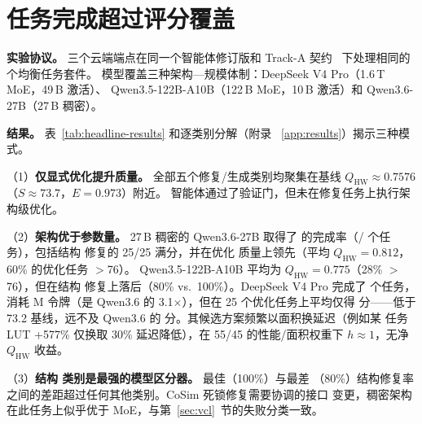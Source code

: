 \section{任务完成超过评分覆盖}
\label{sec:evaluation}

\textbf{实验协议。} 三个云端端点在同一个智能体修订版和 Track-A
契约~\cite{fpt26tracka} 下处理相同的 \CorpusTaskCount{} 个均衡任务套件。
模型覆盖三种架构—规模体制：DeepSeek V4 Pro（1.6\,T MoE，49\,B 激活）、
Qwen3.5-122B-A10B（122\,B MoE，10\,B 激活）和 Qwen3.6-27B（27\,B 稠密）。

\begin{table}[!h]
  \centering
  \caption{\textbf{最小的稠密模型领先。} 分数估计为
  $100\,Q_{\mathrm{HW}}\,E$。DeepSeek 优化任务平均分低于 73.2 基线；
  详见附录~\ref{app:results}。}
  \label{tab:headline-results}
  \scriptsize
\end{table}

\textbf{结果。} 表~\ref{tab:headline-results} 和逐类别分解（附录
~\ref{app:results}）揭示三种模式。

（1）\textbf{仅显式优化提升质量。} 全部五个修复/生成类别均聚集在基线
$Q_{\mathrm{HW}}{\approx}0.7576$（$S{\approx}73.7$，$E{=}0.973$）附近。
智能体通过了验证门，但未在修复任务上执行架构级优化。

（2）\textbf{架构优于参数量。} 27\,B 稠密的 Qwen3.6-27B 取得了
\QwenThreeSixSuccessRate{} 的完成率（\QwenThreeSixSuccessCount{}/
\CorpusTaskCount{} 个任务），包括结构 \CoSim{} 修复的 25/25 满分，并在优化
质量上领先（平均 $Q_{\mathrm{HW}}{=}0.812$，60\% 的优化任务 $>$76）。
Qwen3.5-122B-A10B 平均为 $Q_{\mathrm{HW}}{=}0.775$（28\% $>$76），但在结构
修复上落后（80\% vs.\ 100\%）。DeepSeek V4 Pro 完成了 \DeepSeekSuccessCount{}
个任务，消耗 \DeepSeekTokensM{}M 令牌（是 Qwen3.6 的 3.1$\times$），但在
25 个优化任务上平均仅得 \DeepSeekQorScore{} 分——低于 73.2 基线，远不及
Qwen3.6 的 \QwenThreeSixQorScore{} 分。其候选方案频繁以面积换延迟（例如某
任务 LUT +577\% 仅换取 30\% 延迟降低），在 55/45 的性能/面积权重下
$h{\approx}1$，无净 $Q_{\mathrm{HW}}$ 收益。

（3）\textbf{结构 \CoSim{} 类别是最强的模型区分器。} 最佳（100\%）与最差
（80\%）结构修复率之间的差距超过任何其他类别。CoSim 死锁修复需要协调的接口
变更，稠密架构在此任务上似乎优于 MoE，与第~\ref{sec:vcl}~节的失败分类一致。

